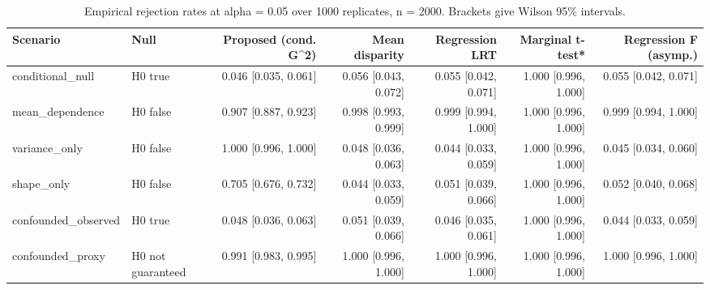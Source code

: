\begin{table}[t]
\centering
\small
\begin{tabular}{llrrrrr}
\toprule
Scenario & Null & Proposed (cond. G\^{}2) & Mean disparity & Regression LRT & Marginal t-test* & Regression F (asymp.) \\
\midrule
conditional\_null & H0 true & 0.046 [0.035, 0.061] & 0.056 [0.043, 0.072] & 0.055 [0.042, 0.071] & 1.000 [0.996, 1.000] & 0.055 [0.042, 0.071] \\
mean\_dependence & H0 false & 0.907 [0.887, 0.923] & 0.998 [0.993, 0.999] & 0.999 [0.994, 1.000] & 1.000 [0.996, 1.000] & 0.999 [0.994, 1.000] \\
variance\_only & H0 false & 1.000 [0.996, 1.000] & 0.048 [0.036, 0.063] & 0.044 [0.033, 0.059] & 1.000 [0.996, 1.000] & 0.045 [0.034, 0.060] \\
shape\_only & H0 false & 0.705 [0.676, 0.732] & 0.044 [0.033, 0.059] & 0.051 [0.039, 0.066] & 1.000 [0.996, 1.000] & 0.052 [0.040, 0.068] \\
confounded\_observed & H0 true & 0.048 [0.036, 0.063] & 0.051 [0.039, 0.066] & 0.046 [0.035, 0.061] & 1.000 [0.996, 1.000] & 0.044 [0.033, 0.059] \\
confounded\_proxy & H0 not guaranteed & 0.991 [0.983, 0.995] & 1.000 [0.996, 1.000] & 1.000 [0.996, 1.000] & 1.000 [0.996, 1.000] & 1.000 [0.996, 1.000] \\
\bottomrule
\end{tabular}
\caption{Empirical rejection rates at alpha = 0.05 over 1000 replicates, n = 2000. Brackets give Wilson 95\% intervals.}
\end{table}

